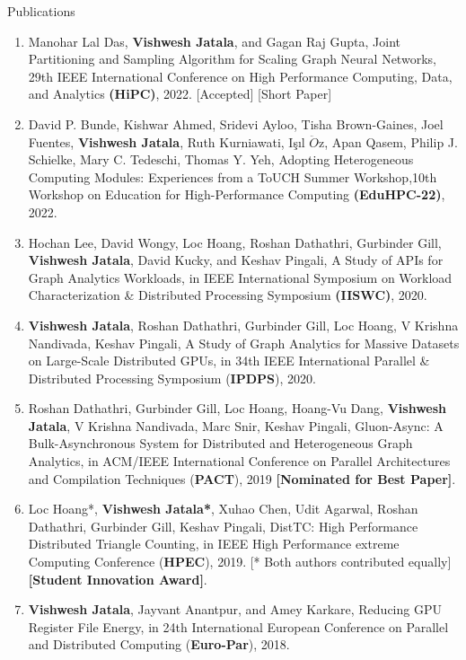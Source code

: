 \documentclass{resume} %
\begin{document}
\begin{rSection}{Publications}
\begin{enumerate}
\item  Manohar Lal Das, \textbf{Vishwesh Jatala}, and Gagan Raj Gupta, Joint Partitioning and Sampling Algorithm for Scaling Graph Neural Networks, 29th IEEE International Conference on High Performance Computing, Data, and Analytics \textbf{(HiPC)}, 2022. [Accepted] [Short Paper]  
\item David P. Bunde, Kishwar Ahmed, Sridevi Ayloo, Tisha Brown-Gaines, Joel Fuentes, \textbf{Vishwesh Jatala}, Ruth Kurniawati, I\c{s}ıl $\ddot{O}$z, Apan Qasem, Philip J. Schielke, Mary C. Tedeschi, Thomas Y. Yeh, Adopting Heterogeneous Computing Modules: Experiences from a ToUCH Summer Workshop,10th Workshop on Education for High-Performance Computing \textbf{(EduHPC-22)}, 2022. \newline [Accepted]
\item Hochan Lee, David Wongy, Loc Hoang, Roshan Dathathri, Gurbinder Gill, \textbf{Vishwesh Jatala}, David Kucky, and Keshav Pingali, A Study of APIs for Graph Analytics Workloads, in IEEE International Symposium on Workload Characterization \& Distributed Processing Symposium \textbf{(IISWC)}, 2020.
\item \textbf{Vishwesh Jatala}, Roshan Dathathri, Gurbinder Gill, Loc Hoang, V Krishna Nandivada, Keshav Pingali, A Study of Graph Analytics for Massive Datasets on Large-Scale Distributed GPUs, in 34th IEEE International Parallel \& Distributed Processing Symposium (\textbf{IPDPS}), 2020. %
\item Roshan Dathathri, Gurbinder Gill, Loc Hoang, Hoang-Vu Dang, \textbf{Vishwesh Jatala}, V Krishna Nandivada, Marc Snir, Keshav Pingali, Gluon-Async: A Bulk-Asynchronous System for Distributed and Heterogeneous Graph Analytics, in ACM/IEEE International Conference on Parallel Architectures and Compilation Techniques (\textbf{PACT}), 2019 \textbf{[Nominated for Best Paper]}.
\item Loc Hoang*, \textbf{Vishwesh Jatala*}, Xuhao Chen, Udit Agarwal, Roshan Dathathri, Gurbinder Gill, Keshav Pingali, DistTC: High Performance Distributed Triangle Counting, in IEEE High Performance extreme Computing Conference (\textbf{HPEC}), 2019.  [* Both authors contributed equally] \textbf{[Student Innovation Award]}.
\item \textbf{Vishwesh Jatala}, Jayvant Anantpur, and Amey Karkare, Reducing GPU Register File Energy, in 24th International European Conference on Parallel and Distributed Computing (\textbf{Euro-Par}), 2018. 

\end{enumerate}
\end{rSection}
\end{document}
